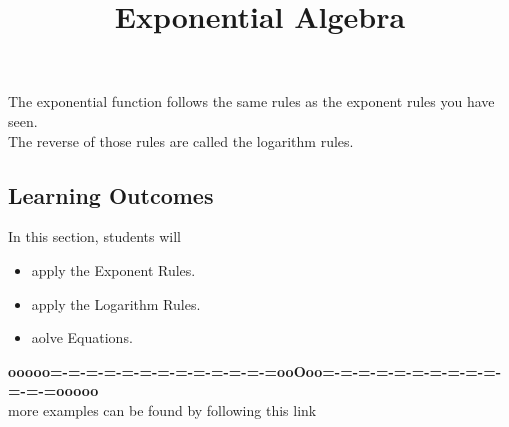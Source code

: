 \documentclass{ximera}
\title{Exponential Algebra}
\begin{document}
\begin{abstract}
\end{abstract}
\maketitle



The exponential function follows the same rules as the exponent rules you have seen. \\


The reverse of those rules are called the logarithm rules.











\subsection{Learning Outcomes}


\begin{sectionOutcomes}
In this section, students will 

\begin{itemize}
\item apply the Exponent Rules.
\item apply the Logarithm Rules.
\item aolve Equations.
\end{itemize}
\end{sectionOutcomes}













\begin{center}
\textbf{\textcolor{green!50!black}{ooooo=-=-=-=-=-=-=-=-=-=-=-=-=ooOoo=-=-=-=-=-=-=-=-=-=-=-=-=ooooo}} \\

more examples can be found by following this link\\ 

\end{center}
\end{document}
